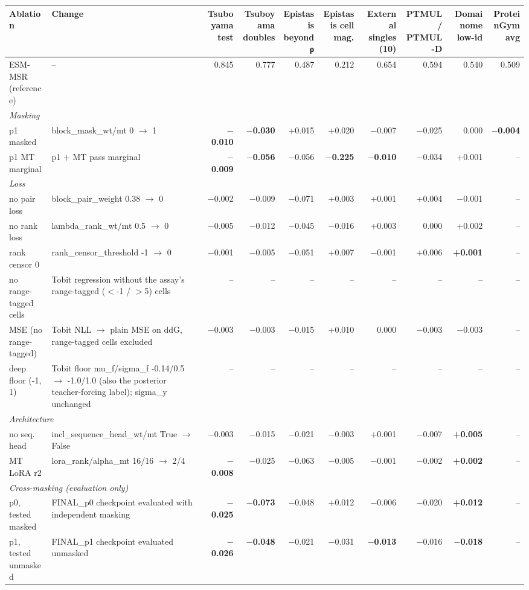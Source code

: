\begin{tabular}{llrrrrrrrr}
\toprule
Ablation & Change & Tsuboyama test & Tsuboyama doubles & Epistasis beyond ρ & Epistasis cell mag. & External singles (10) & PTMUL / PTMUL-D & Domainome low-id & ProteinGym avg \\
\midrule
ESM-MSR (reference) & -- & 0.845 & 0.777 & 0.487 & 0.212 & 0.654 & 0.594 & 0.540 & 0.509 \\
\midrule
\multicolumn{10}{l}{\textit{Masking}} \\
p1 masked & block\_mask\_wt/mt 0 $\to$ 1 & \textbf{$-$0.010} & \textbf{$-$0.030} & +0.015 & +0.020 & $-$0.007 & $-$0.025 & 0.000 & \textbf{$-$0.004} \\
p1 MT marginal & p1 + MT pass marginal & \textbf{$-$0.009} & \textbf{$-$0.056} & $-$0.056 & \textbf{$-$0.225} & \textbf{$-$0.010} & $-$0.034 & +0.001 & -- \\
\midrule
\multicolumn{10}{l}{\textit{Loss}} \\
no pair loss & block\_pair\_weight 0.38 $\to$ 0 & $-$0.002 & $-$0.009 & $-$0.071 & +0.003 & +0.001 & +0.004 & $-$0.001 & -- \\
no rank loss & lambda\_rank\_wt/mt 0.5 $\to$ 0 & $-$0.005 & $-$0.012 & $-$0.045 & $-$0.016 & +0.003 & 0.000 & +0.002 & -- \\
rank censor 0 & rank\_censor\_threshold -1 $\to$ 0 & $-$0.001 & $-$0.005 & $-$0.051 & +0.007 & $-$0.001 & +0.006 & \textbf{+0.001} & -- \\
no range-tagged cells & Tobit regression without the assay's range-tagged ($<$-1 / $>$5) cells & -- & -- & -- & -- & -- & -- & -- & -- \\
MSE (no range-tagged) & Tobit NLL $\to$ plain MSE on ddG, range-tagged cells excluded & $-$0.003 & $-$0.003 & $-$0.015 & +0.010 & 0.000 & $-$0.003 & $-$0.003 & -- \\
deep floor (-1, 1) & Tobit floor mu\_f/sigma\_f -0.14/0.5 $\to$ -1.0/1.0 (also the posterior teacher-forcing label); sigma\_y unchanged & -- & -- & -- & -- & -- & -- & -- & -- \\
\midrule
\multicolumn{10}{l}{\textit{Architecture}} \\
no seq. head & incl\_sequence\_head\_wt/mt True $\to$ False & $-$0.003 & $-$0.015 & $-$0.021 & $-$0.003 & +0.001 & $-$0.007 & \textbf{+0.005} & -- \\
MT LoRA r2 & lora\_rank/alpha\_mt 16/16 $\to$ 2/4 & \textbf{$-$0.008} & $-$0.025 & $-$0.063 & $-$0.005 & $-$0.001 & $-$0.002 & \textbf{+0.002} & -- \\
\midrule
\multicolumn{10}{l}{\textit{Cross-masking (evaluation only)}} \\
p0, tested masked & FINAL\_p0 checkpoint evaluated with independent masking & \textbf{$-$0.025} & \textbf{$-$0.073} & $-$0.048 & +0.012 & $-$0.006 & $-$0.020 & \textbf{+0.012} & -- \\
p1, tested unmasked & FINAL\_p1 checkpoint evaluated unmasked & \textbf{$-$0.026} & \textbf{$-$0.048} & $-$0.021 & $-$0.031 & \textbf{$-$0.013} & $-$0.016 & \textbf{$-$0.018} & -- \\
\bottomrule
\end{tabular}
